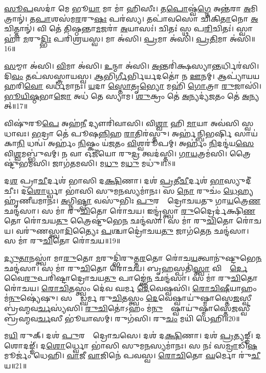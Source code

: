 \ul{𑌸𑍂}\ul{𑌪}𑌸𑌦𑌾॑ 𑌮𑍇 𑌭𑍂\ul{𑌯𑌾} 𑌮𑌾 𑌮𑌾॑ 𑌹𑌿𑌸𑍀𑌃। 
𑌤\ul{𑌪𑍋}𑌷𑍍𑌵॑\ul{𑌗𑍍𑌨𑍇} 𑌅𑌨𑍍𑌤॑𑌰𑌾 \ul{𑌅}𑌮𑌿𑌤𑍍𑌰𑌾𑌨𑍍॑। 
𑌤\ul{𑌪𑌾}𑌶𑌸॑𑌮\ul{𑌰}𑌰𑍁\ul{𑌷𑌃} 𑌪𑌰॑𑌸𑍍𑌯। 
𑌤𑌪𑌾॑𑌵𑌸𑍋 𑌚𑌿𑌕𑌿\ul{𑌤𑌾}𑌨𑍋 \ul{𑌅}𑌚𑌿𑌤𑍍𑌤𑌾𑌨𑍍॑। 
𑌵𑌿 𑌤𑍇॑ 𑌤𑌿𑌷𑍍𑌠𑌨𑍍𑌤𑌾\ul{𑌮}𑌜𑌰𑌾॑ \ul{𑌅}𑌯𑌾𑌸𑌃॑। 
𑌚𑌿𑌤𑌃॑ 𑌸𑍍𑌥 𑌪\ul{𑌰𑌿}𑌚𑌿𑌤𑌃॑। 
𑌸𑍍𑌵𑌾𑌹𑌾॑ \ul{𑌮}𑌰𑍁\ul{𑌦𑍍𑌭𑌿𑌃} 𑌪𑌰𑌿॑𑌶𑍍𑌰𑌯𑌸𑍍𑌵। 
𑌮𑌾 𑌅॑𑌸𑌿। 
\ul{𑌪𑍍𑌰}𑌮𑌾 𑌅॑𑌸𑌿। 
\ul{𑌪𑍍𑌰}\ul{𑌤𑌿}𑌮𑌾 𑌅॑𑌸𑌿॥16॥

\ul{𑌸}𑌮𑍍𑌮𑌾 𑌅॑𑌸𑌿। 
\ul{𑌵𑌿}𑌮𑌾 𑌅॑𑌸𑌿। 
\ul{𑌉}𑌨𑍍𑌮𑌾 𑌅॑𑌸𑌿। 
\ul{𑌅}𑌨𑍍𑌤𑌰𑌿॑𑌕𑍍𑌷𑌸𑍍𑌯𑌾\ul{𑌨𑍍𑌤}𑌰𑍍𑌧𑌿\-𑌰॑𑌸𑌿। 
𑌦𑌿\ul{𑌵𑌂} 𑌤𑌪॑𑌸𑌸𑍍𑌤𑍍𑌰𑌾𑌯𑌸𑍍𑌵। 
\ul{𑌆}𑌭𑌿\ul{𑌰𑍍𑌗𑍀}𑌰𑍍𑌭𑌿𑌰𑍍𑌯𑌦𑌤𑍋॑ 𑌨 \ul{𑌊}𑌨𑌮𑍍। 
𑌆𑌪𑍍𑌯𑌾॑𑌯𑌯 𑌹𑌰𑌿\ul{𑌵𑍋} 𑌵𑌰𑍍𑌧॑𑌮𑌾𑌨𑌃। 
\ul{𑌯}𑌦𑌾 \ul{𑌸𑍍𑌤𑍋}𑌤𑍃\ul{𑌭𑍍𑌯𑍋} 𑌮𑌹𑌿॑ \ul{𑌗𑍋}𑌤𑍍𑌰𑌾 \ul{𑌰𑍁}𑌜𑌾𑌸𑌿॑। 
\ul{𑌭𑍂}\ul{𑌯𑌿}\ul{𑌷𑍍𑌠}𑌭𑌾\ul{𑌜𑍋} 𑌅𑌧॑ 𑌤𑍇 𑌸𑍍𑌯𑌾𑌮। 
\ul{𑌶𑍁}𑌕𑍍𑌰𑌂 𑌤𑍇॑ \ul{𑌅}𑌨𑍍𑌯𑌦𑍍𑌯॑\ul{𑌜}𑌤𑌂 𑌤𑍇॑ \ul{𑌅}𑌨𑍍𑌯𑌤𑍍॥17॥

𑌵𑌿𑌷𑍁॑𑌰𑍂\ul{𑌪𑍇} 𑌅𑌹॑\ul{𑌨𑍀} 𑌦𑍍𑌯𑍗𑌰𑌿॑𑌵𑌾𑌸𑌿। 
𑌵𑌿\ul{𑌶𑍍𑌵𑌾} 𑌹𑌿 \ul{𑌮𑌾}𑌯𑌾 𑌅𑌵॑𑌸𑌿 𑌸𑍍𑌵𑌧𑌾𑌵𑌃। 
\ul{𑌭}𑌦𑍍𑌰𑌾 𑌤𑍇॑ 𑌪𑍂𑌷\ul{𑌨𑍍𑌨𑌿}𑌹 \ul{𑌰𑌾}𑌤𑌿𑌰॑𑌸𑍍𑌤𑍁। 
𑌅𑌰𑍍\mbox{}𑌹॑𑌨𑍍𑌬𑌿𑌭𑌰𑍍\mbox{}\ul{𑌷𑌿} 𑌸𑌾𑌯॑𑌕𑌾\ul{𑌨𑌿} 𑌧𑌨𑍍𑌵॑। 
𑌅𑌰𑍍\mbox{}𑌹𑌂॑ \ul{𑌨𑌿}𑌷𑍍𑌕𑌂 𑌯॑\ul{𑌜}𑌤𑌂  \ul{𑌵𑌿}𑌶𑍍𑌵𑌰𑍂॑𑌪𑌮𑍍। 
𑌅𑌰𑍍\mbox{}𑌹𑌂॑ \ul{𑌨𑌿}𑌦𑌨𑍍𑌦॑𑌯\ul{𑌸𑍇} 𑌵𑌿\ul{𑌶𑍍𑌵}𑌮𑌬𑍍𑌭𑍁॑𑌵𑌮𑍍। 
𑌨 𑌵𑌾 𑌓𑌜𑍀॑𑌯𑍋 𑌰𑍁\ul{𑌦𑍍𑌰} 𑌤𑍍𑌵𑌦॑𑌸𑍍𑌤𑌿। 
\ul{𑌗𑌾}\ul{𑌯}𑌤𑍍𑌰𑌮॑𑌸𑌿। 
𑌤𑍍𑌰𑍈𑌷𑍍𑌟𑍁॑𑌭𑌮𑌸𑌿। 
𑌜𑌾𑌗॑𑌤𑌮𑌸𑌿। 
𑌮\ul{𑌧𑍁} 𑌮\ul{𑌧𑍁} 𑌮𑌧𑍁॑॥18॥
\anuvakamend[\ul{𑌅}\ul{𑌨}\ul{𑌕𑍍𑌤𑍍𑌵}\ul{𑌸𑌾}\ul{𑌦𑍀}\ul{𑌦𑍁}\ul{𑌤𑍍𑌤}\ul{𑌰}𑌤𑌃 𑌪𑌾॑𑌹𑌿 𑌪𑍍𑌰\ul{𑌤𑌿}𑌮𑌾 𑌅॑𑌸𑌿 𑌯\ul{𑌜}𑌤𑌨𑍍𑌤𑍇॑ \ul{𑌅}𑌨𑍍𑌯𑌜𑍍𑌜𑌾𑌗॑𑌤\ul{𑌮}𑌸𑍍𑌯𑍇𑌕𑌂॑ 𑌚]

𑌦\ul{𑌶} 𑌪𑍍𑌰𑌾\ul{𑌚𑍀}𑌰𑍍𑌦𑌶॑ 𑌭𑌾𑌸𑌿 𑌦\ul{𑌕𑍍𑌷𑌿}𑌣𑌾। 
𑌦𑌶॑ \ul{𑌪𑍍𑌰}𑌤𑍀\ul{𑌚𑍀}𑌰𑍍𑌦𑌶॑ \ul{𑌭𑌾}𑌸𑍍𑌯𑍁𑌦𑍀॑𑌚𑍀𑌃। 
𑌦\ul{𑌶𑍋}𑌰𑍍𑌧𑍍𑌵𑌾 𑌭𑌾॑𑌸𑌿 𑌸𑍁𑌮\ul{𑌨}𑌸𑍍𑌯𑌮𑌾॑𑌨𑌃। 
𑌸 \ul{𑌨𑍋} 𑌰𑍁𑌚𑌂॑ \ul{𑌧𑍇}𑌹𑍍𑌯𑌹𑍃॑𑌣𑍀𑌯𑌮𑌾𑌨𑌃। 
\ul{𑌅}𑌗𑍍𑌨𑌿\ul{𑌷𑍍𑌟𑍍𑌵𑌾} 𑌵𑌸𑍁॑𑌭𑌿𑌃 \ul{𑌪𑍁}𑌰𑌸𑍍𑌤𑌾᳚𑌦𑍍𑌰𑍋𑌚𑌯𑌤𑍁 𑌗𑌾\ul{𑌯}𑌤𑍍𑌰𑍇\ul{𑌣} 𑌛𑌨𑍍𑌦॑𑌸𑌾। 
𑌸 𑌮𑌾॑ 𑌰𑍁\ul{𑌚𑌿}𑌤𑍋 𑌰𑍋॑𑌚𑌯। 
𑌇𑌨𑍍𑌦𑍍𑌰॑𑌸𑍍𑌤𑍍𑌵𑌾 \ul{𑌰𑍁}𑌦𑍍𑌰𑍈𑌰𑍍𑌦॑𑌕𑍍𑌷𑌿\ul{𑌣}𑌤𑍋 𑌰𑍋॑𑌚𑌯\ul{𑌤𑍁} 𑌤𑍍𑌰𑍈𑌷𑍍𑌟𑍁॑𑌭𑍇\ul{𑌨} 𑌛𑌨𑍍𑌦॑𑌸𑌾। 
𑌸 𑌮𑌾॑ 𑌰𑍁\ul{𑌚𑌿}𑌤𑍋 𑌰𑍋॑𑌚𑌯। 
𑌵𑌰𑍁॑𑌣𑌸𑍍𑌤𑍍𑌵𑌾\ul{𑌦𑌿}𑌤𑍍𑌯𑍈𑌃 \ul{𑌪}𑌶𑍍𑌚𑌾𑌦𑍍𑌰𑍋॑𑌚𑌯\ul{𑌤𑍁} 𑌜𑌾𑌗॑𑌤𑍇\ul{𑌨} 𑌛𑌨𑍍𑌦॑𑌸𑌾। 
𑌸 𑌮𑌾॑ 𑌰𑍁\ul{𑌚𑌿}𑌤𑍋 𑌰𑍋॑𑌚𑌯॥19॥

\ul{𑌦𑍍𑌯𑍁}\ul{𑌤𑌾}𑌨𑌸𑍍𑌤𑍍𑌵𑌾॑ 𑌮𑌾\ul{𑌰𑍁}𑌤𑍋 \ul{𑌮}𑌰𑍁𑌦𑍍𑌭𑌿॑𑌰𑍁𑌤𑍍𑌤\ul{𑌰}𑌤𑍋 𑌰𑍋॑𑌚\ul{𑌯}𑌤𑍍𑌵𑌾𑌨𑍁॑𑌷𑍍𑌟𑍁𑌭𑍇\ul{𑌨} 𑌛𑌨𑍍𑌦॑𑌸𑌾। 
𑌸 𑌮𑌾॑ 𑌰𑍁\ul{𑌚𑌿}𑌤𑍋 𑌰𑍋॑𑌚𑌯। 
𑌬𑍃\ul{𑌹}𑌸𑍍𑌪𑌤𑌿॑\ul{𑌸𑍍𑌤𑍍𑌵𑌾} 𑌵𑌿𑌶𑍍𑌵𑍈᳚\ul{𑌰𑍍𑌦𑍇}𑌵𑍈\ul{𑌰𑍁}𑌪𑌰𑌿॑𑌷𑍍𑌟𑌾𑌦𑍍𑌰𑍋𑌚𑌯\ul{𑌤𑍁} 𑌪𑌾𑌙𑍍𑌕𑍍𑌤𑍇॑\ul{𑌨} 𑌛𑌨𑍍𑌦॑𑌸𑌾। 
𑌸 𑌮𑌾॑ 𑌰𑍁\ul{𑌚𑌿}𑌤𑍋 𑌰𑍋॑𑌚𑌯। 
\ul{𑌰𑍋}\ul{𑌚𑌿}𑌤𑌸𑍍𑌤𑍍𑌵𑌂 𑌦𑍇॑𑌵 𑌘𑌰𑍍𑌮 \ul{𑌦𑍇}𑌵𑍇𑌷𑍍𑌵𑌸𑌿॑। 
\ul{𑌰𑍋}\ul{𑌚𑌿}\ul{𑌷𑍀}𑌯𑌾𑌹𑌂 𑌮॑\ul{𑌨𑍁}𑌷𑍍𑌯𑍇॑𑌷𑍁। 
𑌸𑌮𑍍𑌰𑌾᳚𑌡𑍍𑌘𑌰𑍍𑌮 𑌰𑍁\ul{𑌚𑌿}𑌤𑌸𑍍𑌤𑍍𑌵𑌂 \ul{𑌦𑍇}𑌵𑍇𑌷𑍍𑌵𑌾𑌯𑍁॑𑌷𑍍𑌮𑌾𑌸𑍍𑌤𑍇\ul{𑌜}𑌸𑍍𑌵𑍀 𑌬𑍍𑌰॑𑌹𑍍𑌮𑌵\ul{𑌰𑍍𑌚}𑌸𑍍𑌯॑𑌸𑌿। 
\ul{𑌰𑍁}\ul{𑌚𑌿}𑌤𑍋॑𑌽𑌹𑌂 𑌮॑\ul{𑌨𑍁}𑌷𑍍𑌯𑍇᳚𑌷𑍍𑌵𑌾𑌯𑍁॑𑌷𑍍𑌮𑌾𑌸𑍍𑌤𑍇\ul{𑌜}𑌸𑍍𑌵𑍀 𑌬𑍍𑌰॑𑌹𑍍𑌮𑌵\ul{𑌰𑍍𑌚}𑌸𑍀 𑌭𑍂॑𑌯𑌾𑌸𑌮𑍍। 
𑌰𑍁𑌗॑𑌸𑌿। 
𑌰𑍁\ul{𑌚𑌂} 𑌮𑌯𑌿॑ 𑌧𑍇𑌹𑌿॥20॥

𑌮\ul{𑌯𑌿} 𑌰𑍁𑌕𑍍। 
𑌦𑌶॑ \ul{𑌪𑍁}𑌰𑌸𑍍𑌤𑌾᳚𑌦𑍍𑌰𑍋𑌚𑌸𑍇। 
𑌦𑌶॑ 𑌦\ul{𑌕𑍍𑌷𑌿}𑌣𑌾। 
𑌦𑌶॑ \ul{𑌪𑍍𑌰}𑌤𑍍𑌯𑌙𑍍𑌙𑍍। 
𑌦𑌶𑍋𑌦𑌙𑍍𑌙𑍍॑। 
𑌦\ul{𑌶𑍋}𑌰𑍍𑌧𑍍𑌵𑍋 𑌭𑌾॑𑌸𑌿 𑌸𑍁𑌮\ul{𑌨}𑌸𑍍𑌯𑌮𑌾॑𑌨𑌃। 
𑌸 𑌨𑌃॑ 𑌸\ul{𑌮𑍍𑌰𑌾}𑌡𑌿\ul{𑌷}𑌮𑍂𑌰𑍍𑌜𑌂॑ 𑌧𑍇𑌹𑌿। 
\ul{𑌵𑌾}𑌜𑍀 \ul{𑌵𑌾}𑌜𑌿𑌨𑍇॑ 𑌪𑌵𑌸𑍍𑌵। 
\ul{𑌰𑍋}\ul{𑌚𑌿}𑌤𑍋 \ul{𑌘}𑌰𑍍𑌮𑍋 𑌰𑍁॑\ul{𑌚𑍀}𑌯॥21॥
\anuvakamend[\ul{𑌰𑍋}\ul{𑌚}\ul{𑌯} \ul{𑌧𑍇}\ul{𑌹𑌿} 𑌨𑌵॑ 𑌚]

